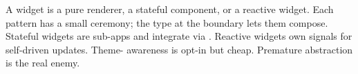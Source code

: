 \begin{recap}
A widget is a pure renderer, a stateful component, or a
reactive widget. Each pattern has a small ceremony; the
 type at the boundary lets them compose.
Stateful widgets are sub-apps and integrate via .
Reactive widgets own signals for self-driven updates. Theme-
awareness is opt-in but cheap. Premature abstraction is the
real enemy.
\end{recap}
